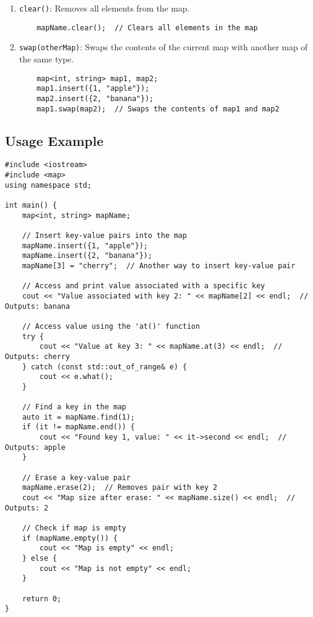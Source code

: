 \documentclass{article}
\begin{document}
\begin{enumerate}
\begin{lstlisting}
    }
    \end{lstlisting}
    \item \texttt{clear()}: Removes all elements from the map.
    \begin{lstlisting}
    mapName.clear();  // Clears all elements in the map
    \end{lstlisting}
    \item \texttt{swap(otherMap)}: Swaps the contents of the current map with another map of the same type.
    \begin{lstlisting}
    map<int, string> map1, map2;
    map1.insert({1, "apple"});
    map2.insert({2, "banana"});
    map1.swap(map2);  // Swaps the contents of map1 and map2
    \end{lstlisting}
\end{enumerate}

\subsection{Usage Example}

\begin{lstlisting}
#include <iostream>
#include <map>
using namespace std;

int main() {
    map<int, string> mapName;
    
    // Insert key-value pairs into the map
    mapName.insert({1, "apple"});
    mapName.insert({2, "banana"});
    mapName[3] = "cherry";  // Another way to insert key-value pair
    
    // Access and print value associated with a specific key
    cout << "Value associated with key 2: " << mapName[2] << endl;  // Outputs: banana
    
    // Access value using the 'at()' function
    try {
        cout << "Value at key 3: " << mapName.at(3) << endl;  // Outputs: cherry
    } catch (const std::out_of_range& e) {
        cout << e.what();
    }
    
    // Find a key in the map
    auto it = mapName.find(1);
    if (it != mapName.end()) {
        cout << "Found key 1, value: " << it->second << endl;  // Outputs: apple
    }
    
    // Erase a key-value pair
    mapName.erase(2);  // Removes pair with key 2
    cout << "Map size after erase: " << mapName.size() << endl;  // Outputs: 2
    
    // Check if map is empty
    if (mapName.empty()) {
        cout << "Map is empty" << endl;
    } else {
        cout << "Map is not empty" << endl;
    }
    
    return 0;
}
\end{lstlisting}
\end{document}
